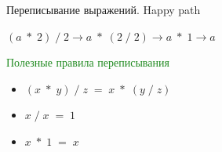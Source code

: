 \documentclass[aspectratio=169
  , xcolor={svgnames}
  , russian  %
  ]{beamer}
\begin{document}
\begin{frame}{Переписывание выражений. Happy path}
{
    \Huge{ \centering
    $(a \; *\; 2)\; / \;2 \rightarrow a \;*\; (2\; /\; 2) \rightarrow a \;*\; 1 \rightarrow a$
    }

    \vspace{1cm} %

    {\fontsize{16.1}{12}\selectfont \textcolor{ForestGreen}{Полезные правила переписывания}}
    {\fontsize{16.1}{12}\selectfont %
    \begin{itemize}
        \item $(x\; * \;y) \;/ \;z \;= \;x\; * \;(y \;/ \;z)$
        \item $x \; / \; x \; = \; 1$
        \item $x \; * \; 1 \; = \; x$
    \end{itemize}
    }
}
\end{frame}
\end{document}
